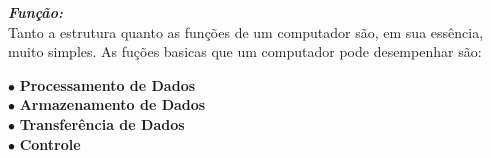   \textbf{\textit{Função:}} \\

  Tanto a estrutura quanto as funções de um computador são, em sua essência, muito simples. As fuções basicas que um computador pode desempenhar são:

  $ \bullet $ \textbf{Processamento de Dados} \\
  $ \bullet $ \textbf{Armazenamento de Dados} \\
  $ \bullet $ \textbf{Transferência de Dados} \\
  $ \bullet $ \textbf{Controle} \\




